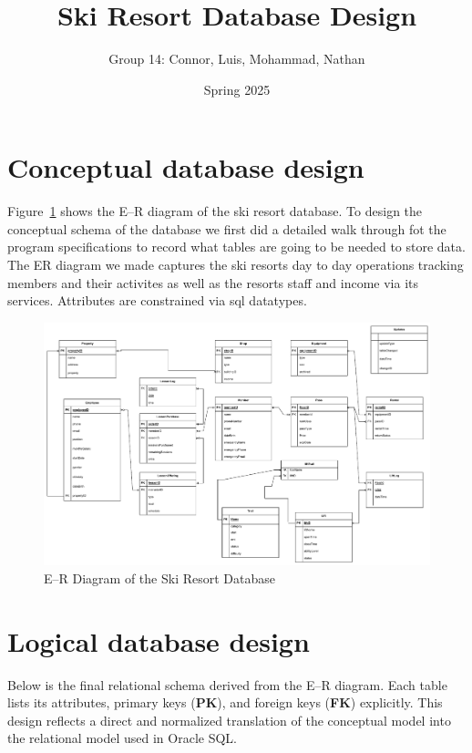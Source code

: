 \documentclass[11pt]{scrartcl}
\title{Ski Resort Database Design}
\author{Group 14: Connor, Luis, Mohammad, Nathan}
\date{Spring 2025}
\begin{document}
\maketitle
\tableofcontents

\section{Conceptual database design}
Figure~\ref{fig:er_diagram} shows the E--R diagram of the ski resort database. 
To design the conceptual schema of the database we first did a detailed walk through fot the program specifications to record what tables are going to be needed to store data. 
The ER diagram we made captures the ski resorts day to day operations tracking members and their activites as well as the resorts staff and income via its services. Attributes
are constrained via sql datatypes.

\begin{figure}[h]
  \centering
  \includegraphics[width=1.1\textwidth]{er.pdf}
  \caption{E--R Diagram of the Ski Resort Database}
  \label{fig:er_diagram}
\end{figure}

\section{Logical database design}

Below is the final relational schema derived from the E--R diagram. Each table lists its attributes, primary keys (\textbf{PK}), and foreign keys (\textbf{FK}) explicitly. 
This design reflects a direct and normalized translation of the conceptual model into the relational model used in Oracle SQL.
\end{document}
